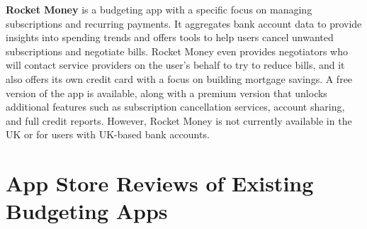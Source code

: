 \documentclass{l4proj}
\begin{document}
\begin{appendices}
\textbf{Rocket Money} is a budgeting app with a specific focus on managing subscriptions and recurring payments. It aggregates bank account data to provide insights into spending trends and offers tools to help users cancel unwanted subscriptions and negotiate bills. Rocket Money even provides negotiators who will contact service providers on the user’s behalf to try to reduce bills, and it also offers its own credit card with a focus on building mortgage savings. A free version of the app is available, along with a premium version that unlocks additional features such as subscription cancellation services, account sharing, and full credit reports. However, Rocket Money is not currently available in the UK or for users with UK-based bank accounts.

\chapter{App Store Reviews of Existing Budgeting Apps}
\label{app:reviews}

\end{appendices}
\end{document}
